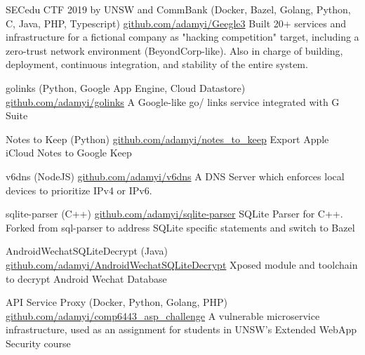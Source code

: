 \documentclass[hidelinks__VERSION__]{adamyi-cv}
\begin{document}
\begin{entrylist}


\entry
{SECedu CTF 2019 by UNSW and CommBank (Docker, Bazel, Golang, Python, C, Java, PHP, Typescript)}
{\href{https://github.com/adamyi/Geegle3}{github.com/adamyi/Geegle3}}
{Built 20+ services and infrastructure for a fictional company as "hacking competition" target, including a zero-trust network environment (BeyondCorp-like). Also in charge of building, deployment, continuous integration, and stability of the entire system.}


\entry
{golinks (Python, Google App Engine, Cloud Datastore)}
{\href{https://github.com/adamyi/golinks}{github.com/adamyi/golinks}}
{A Google-like go/ links service integrated with G Suite}


\entry
{Notes to Keep (Python)}
{\href{https://github.com/adamyi/notes_to_keep}{github.com/adamyi/notes\_to\_keep}}
{Export Apple iCloud Notes to Google Keep}


\entry
{v6dns (NodeJS)}
{\href{https://github.com/adamyi/v6dns}{github.com/adamyi/v6dns}}
{A DNS Server which enforces local devices to prioritize IPv4 or IPv6.}


\entry
{sqlite-parser (C++)}
{\href{https://github.com/adamyi/sqlite-parser}{github.com/adamyi/sqlite-parser}}
{SQLite Parser for C++. Forked from sql-parser to address SQLite specific statements and switch to Bazel}


\entry
{AndroidWechatSQLiteDecrypt (Java)}
{\href{https://github.com/adamyi/AndroidWechatSQLiteDecrypt}{github.com/adamyi/AndroidWechatSQLiteDecrypt}}
{Xposed module and toolchain to decrypt Android Wechat Database}


\entry
{API Service Proxy (Docker, Python, Golang, PHP)}
{\href{https://github.com/adamyi/comp6443_asp_challenge}{github.com/adamyi/comp6443\_asp\_challenge}}
{A vulnerable microservice infrastructure, used as an assignment for students in UNSW's Extended WebApp Security course}


\end{entrylist}
\end{document}
